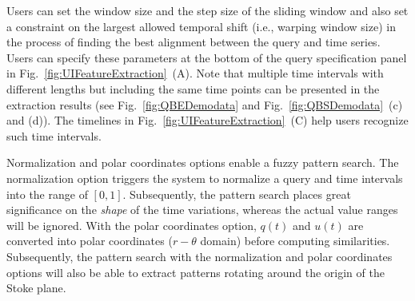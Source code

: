 Users can set the window size and the step size of the sliding window and also set a constraint on the largest allowed temporal shift (i.e., warping window size)
in the process of finding the best alignment between the query and time series.
Users can specify these parameters at the bottom of the query specification panel in Fig.~\ref{fig:UIFeatureExtraction}~(A).
Note that multiple time intervals with different lengths but including the same time points can be presented in the extraction results (see Fig.~\ref{fig:QBEDemodata} and Fig.~\ref{fig:QBSDemodata}~(c) and (d)). %
The timelines in Fig.~\ref{fig:UIFeatureExtraction}~(C) help users recognize such time intervals. 

Normalization and polar coordinates options enable a fuzzy pattern search.
The normalization option triggers the system to normalize a query and time intervals into the range of $[0, 1]$.
Subsequently, the pattern search places great significance on the \emph{shape} of the time variations, whereas the actual value ranges will be ignored.
With the polar coordinates option, 
$q(t)$ and $u(t)$ are converted into polar coordinates ($r-\theta$ domain) before computing similarities.
Subsequently, the pattern search with the normalization and polar coordinates options will also be able to extract patterns rotating around the origin of the Stoke plane.

%
%
